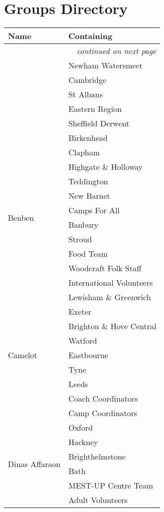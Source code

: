 \documentclass[a4paper, 11pt]{report}
\begin{document}
\section{Groups Directory}
{\RaggedRight \centering
\begin{longtable}{p{} p{}}
    \textbf{Name} & \textbf{Containing}\\
        \hline
        \endhead

        \multicolumn{2}{r}{\footnotesize\itshape continued on next page}\\
        \endfoot 
        
        \endlastfoot
        \multirow{6}{*}{Asgard} & Newham Watersmeet\\*
        & Cambridge\\*
        & St Albans\\*
        & Eastern Region\\*
        & Sheffield Derwent\\*
        & Birkenhead\\
        \hline

        \multirow{10}{*}{Benben} & Clapham\\*
        &  Highgate \& Holloway \\*
        &  Teddington \\*
        &  New Barnet \\*
        &  Camps For All \\*
        &  Banbury \\*
        &  Stroud \\*
        &  Food Team \\*
        &  Woodcraft Folk Staff \\*
        &  International Volunteers \\*
        \hline

        \multirow{9}{*}{Camelot} & Lewisham \& Greenwich\\*
        & Exeter \\*
        & Brighton \& Hove Central \\*
        & Watford \\*
        & Eastbourne \\*
        & Tyne \\*
        & Leeds \\*
        & Coach Coordinators \\*
        & Camp Coordinators \\
        \hline

        \multirow{6}{*}{Dinas Affaraon} & Oxford\\*
        & Hackney \\*
        & Brighthelmstone \\*
        & Bath \\*
        & MEST-UP Centre Team \\*
        & Adult Volunteers \\
        \hline


\end{longtable}}
\end{document}
